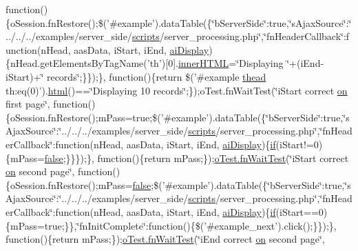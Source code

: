 \begin{DoxyCompactItemize}
function()\{o\+Session.\+fn\+Restore();\$('\#example').data\+Table(\{\char`\"{}b\+Server\+Side\char`\"{}\+:true,\char`\"{}s\+Ajax\+Source\char`\"{}\+:\char`\"{}../../../examples/server\+\_\+side/\hyperlink{tinymce_8jquery_8dev_8js_a09066d4d580eeec222f858d588b4cdef}{scripts}/server\+\_\+processing.\+php\char`\"{},\char`\"{}fn\+Header\+Callback\char`\"{}\+:function(n\+Head, aas\+Data, i\+Start, i\+End, \hyperlink{core_8constructor_8js_ab6500ff83985151859ca3105a6eb888c}{ai\+Display})\{n\+Head.\+get\+Elements\+By\+Tag\+Name('th')\mbox{[}0\mbox{]}.\hyperlink{jquery-ui_8js_a87f73c4f0391c1cf9fe60374a76d9a7b}{inner\+H\+T\+M\+L}=\char`\"{}Displaying \char`\"{}+(i\+End-\/i\+Start)+\char`\"{} records\char`\"{};\}\});\}, function()\{return \$('\#example \hyperlink{core_8constructor_8js_a856be760b6816c9591ce69f0a2b43693}{thead} th\+:eq(0)').\hyperlink{tinymce_8jquery_8dev_8js_ac2090bcf2ff968c0083d5de53a6544f3}{html}()==\char`\"{}Displaying 10 records\char`\"{};\});o\+Test.\+fn\+Wait\+Test(\char`\"{}i\+Start correct \hyperlink{fullpage_2plugin_8min_8js_a1cfa98b7fed2aaf9fee3b68dbb7f9497}{on} first page\char`\"{}, function()\{o\+Session.\+fn\+Restore();m\+Pass=true;\$('\#example').data\+Table(\{\char`\"{}b\+Server\+Side\char`\"{}\+:true,\char`\"{}s\+Ajax\+Source\char`\"{}\+:\char`\"{}../../../examples/server\+\_\+side/\hyperlink{tinymce_8jquery_8dev_8js_a09066d4d580eeec222f858d588b4cdef}{scripts}/server\+\_\+processing.\+php\char`\"{},\char`\"{}fn\+Header\+Callback\char`\"{}\+:function(n\+Head, aas\+Data, i\+Start, i\+End, \hyperlink{core_8constructor_8js_ab6500ff83985151859ca3105a6eb888c}{ai\+Display})\{\hyperlink{fullpage_2plugin_8js_a8b98017e64ef036adb9ae327ff94abe1}{if}(i\+Start!=0)\{m\+Pass=\hyperlink{validate_8js_a5df37b7f02e5cdc7d9412b7f872b8e01}{false};\}\}\});\}, function()\{return m\+Pass;\});\hyperlink{onhold_24__server-side_2__zero__config_8js_ab25c4d596771c0133cdc45178ce72c3d}{o\+Test.\+fn\+Wait\+Test}(\char`\"{}i\+Start correct \hyperlink{fullpage_2plugin_8min_8js_a1cfa98b7fed2aaf9fee3b68dbb7f9497}{on} second page\char`\"{}, function()\{o\+Session.\+fn\+Restore();m\+Pass=\hyperlink{validate_8js_a5df37b7f02e5cdc7d9412b7f872b8e01}{false};\$('\#example').data\+Table(\{\char`\"{}b\+Server\+Side\char`\"{}\+:true,\char`\"{}s\+Ajax\+Source\char`\"{}\+:\char`\"{}../../../examples/server\+\_\+side/\hyperlink{tinymce_8jquery_8dev_8js_a09066d4d580eeec222f858d588b4cdef}{scripts}/server\+\_\+processing.\+php\char`\"{},\char`\"{}fn\+Header\+Callback\char`\"{}\+:function(n\+Head, aas\+Data, i\+Start, i\+End, \hyperlink{core_8constructor_8js_ab6500ff83985151859ca3105a6eb888c}{ai\+Display})\{\hyperlink{fullpage_2plugin_8js_a8b98017e64ef036adb9ae327ff94abe1}{if}(i\+Start==0)\{m\+Pass=true;\}\},\char`\"{}fn\+Init\+Complete\char`\"{}\+:function()\{\$('\#example\+\_\+next').click();\}\});\}, function()\{return m\+Pass;\});\hyperlink{onhold_24__server-side_2__zero__config_8js_ab25c4d596771c0133cdc45178ce72c3d}{o\+Test.\+fn\+Wait\+Test}(\char`\"{}i\+End correct \hyperlink{fullpage_2plugin_8min_8js_a1cfa98b7fed2aaf9fee3b68dbb7f9497}{on} second page\char`\"{}, 
\end{DoxyCompactItemize}
